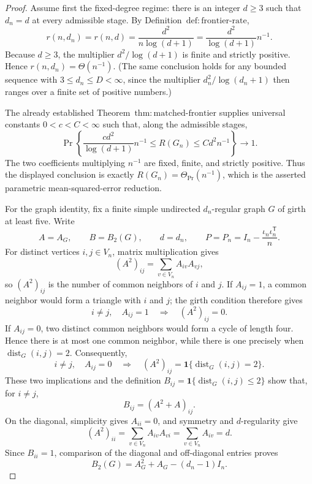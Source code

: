 \documentclass{article}
\begin{document}
\begin{proof}
Assume first the fixed-degree regime: there is an integer \(d\ge 3\) such that \(d_n=d\) at every admissible stage.  By Definition~\(\mathrm{def{:}frontier\mbox{-}rate}\),
\[
r(n,d_n)=r(n,d)=\frac{d^2}{n\log(d+1)}
=\frac{d^2}{\log(d+1)}n^{-1}.
\]
Because \(d\ge3\), the multiplier \(d^2/\log(d+1)\) is finite and strictly positive.  Hence \(r(n,d_n)=\Theta(n^{-1})\).  (The same conclusion holds for any bounded sequence with \(3\le d_n\le D<\infty\), since the multiplier \(d_n^2/\log(d_n+1)\) then ranges over a finite set of positive numbers.)

The already established Theorem~\(\mathrm{thm{:}matched\mbox{-}frontier}\) supplies universal constants \(0<c<C<\infty\) such that, along the admissible stages,
\[
\Pr\!\left\{
\frac{c d^2}{\log(d+1)}n^{-1}
\le R(G_n)\le C d^2 n^{-1}
\right\}\longrightarrow1.
\]
The two coefficients multiplying \(n^{-1}\) are fixed, finite, and strictly positive.  Thus the displayed conclusion is exactly \(R(G_n)=\Theta_{\Pr}(n^{-1})\), which is the asserted parametric mean-squared-error reduction.

For the graph identity, fix a finite simple undirected \(d_n\)-regular graph \(G\) of girth at least five.  Write
\[
A=A_G,\qquad B=B_2(G),\qquad d=d_n,
\qquad P=P_n=I_n-\frac{\iota_n\iota_n^{\mathsf T}}{n}.
\]
For distinct vertices \(i,j\in V_n\), matrix multiplication gives
\[
(A^2)_{ij}=\sum_{v\in V_n}A_{iv}A_{vj},
\]
so \((A^2)_{ij}\) is the number of common neighbors of \(i\) and \(j\).  If \(A_{ij}=1\), a common neighbor would form a triangle with \(i\) and \(j\); the girth condition therefore gives
\[
i\ne j,\quad A_{ij}=1
\quad\Longrightarrow\quad (A^2)_{ij}=0.
\]
If \(A_{ij}=0\), two distinct common neighbors would form a cycle of length four.  Hence there is at most one common neighbor, while there is one precisely when \(\operatorname{dist}_G(i,j)=2\).  Consequently,
\[
i\ne j,\quad A_{ij}=0
\quad\Longrightarrow\quad
(A^2)_{ij}=\mathbf 1\{\operatorname{dist}_G(i,j)=2\}.
\]
These two implications and the definition
\(B_{ij}=\mathbf 1\{\operatorname{dist}_G(i,j)\le2\}\) show that, for \(i\ne j\),
\[
B_{ij}=(A^2+A)_{ij}.
\]
On the diagonal, simplicity gives \(A_{ii}=0\), and symmetry and \(d\)-regularity give
\[
(A^2)_{ii}=\sum_{v\in V_n}A_{iv}A_{vi}
=\sum_{v\in V_n}A_{iv}=d.
\]
Since \(B_{ii}=1\), comparison of the diagonal and off-diagonal entries proves
\[
B_2(G)=A_G^2+A_G-(d_n-1)I_n.
\tag{1}
\]


\end{proof}
\end{document}
